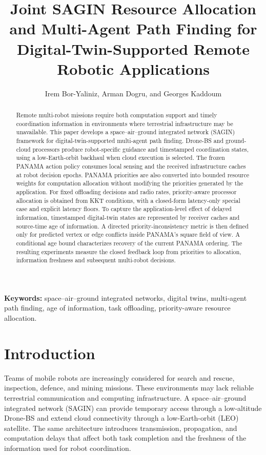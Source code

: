 \IfFileExists{IEEEtran.cls}{\documentclass[conference]{IEEEtran}}{\documentclass[10pt,twocolumn]{article}}
\title{Joint SAGIN Resource Allocation and Multi-Agent
Path Finding for Digital-Twin-Supported Remote
Robotic Applications}
\author{Irem Bor-Yaliniz, Arman Dogru, and Georges Kaddoum}
\newenvironment{IEEEkeywords}{\par\noindent\textbf{Keywords: }}{\par}
\begin{document}
\raggedbottom
\maketitle

\begin{abstract}
Remote multi-robot missions require both computation support and timely coordination information in environments where terrestrial infrastructure may be unavailable. This paper develops a space--air--ground integrated network (SAGIN) framework for digital-twin-supported multi-agent path finding. Drone-BS and ground-cloud processors produce robot-specific guidance and timestamped coordination states, using a low-Earth-orbit backhaul when cloud execution is selected. The frozen PANAMA action policy consumes local sensing and the received infrastructure caches at robot decision epochs. PANAMA priorities are also converted into bounded resource weights for computation allocation without modifying the priorities generated by the application. For fixed offloading decisions and radio rates, priority-aware processor allocation is obtained from KKT conditions, with a closed-form latency-only special case and explicit latency floors. To capture the application-level effect of delayed information, timestamped digital-twin states are represented by receiver caches and source-time age of information. A directed priority-inconsistency metric is then defined only for predicted vertex or edge conflicts inside PANAMA's square field of view. A conditional age bound characterizes recovery of the current PANAMA ordering. The resulting experiments measure the closed feedback loop from priorities to allocation, information freshness and subsequent multi-robot decisions.
\end{abstract}

\begin{IEEEkeywords}
space--air--ground integrated networks, digital twins, multi-agent path finding, age of information, task offloading, priority-aware resource allocation.
\end{IEEEkeywords}

\section{Introduction}
Teams of mobile robots are increasingly considered for search and rescue, inspection, defence, and mining missions. These environments may lack reliable terrestrial communication and computing infrastructure. A space--air--ground integrated network (SAGIN) can provide temporary access through a low-altitude Drone-BS and extend cloud connectivity through a low-Earth-orbit (LEO) satellite. The same architecture introduces transmission, propagation, and computation delays that affect both task completion and the freshness of the information used for robot coordination.
\end{document}
